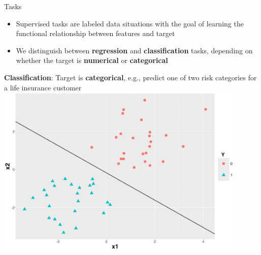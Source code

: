 \documentclass[11pt,compress,t,notes=noshow, xcolor=table]{beamer}
\begin{document}
\begin{vbframe}{Tasks}
\begin{itemize}
    \item Supervised tasks are labeled data situations with the goal of learning the functional
        relationship between features and target

    \item We distinguish between \textbf{regression} and \textbf{classification} tasks, depending on whether the
        target is \textbf{numerical} or \textbf{categorical}
\end{itemize}

\lz

{
\small \textbf{Classification}: Target is \textbf{categorical}, e.g., predict one of two risk categories for a life insurance customer
\vspace{1em}
    \includegraphics[width=0.9\textwidth]{figure/nutshell-ml-basics-supervised-classification-task.png}
}

\end{vbframe}
\end{document}
